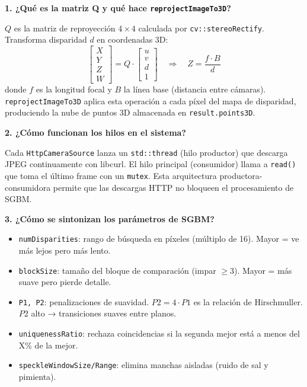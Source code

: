 \documentclass[11pt,a4paper]{article}
\begin{document}
\textbf{1. ¿Qué es la matriz Q y qué hace \texttt{reprojectImageTo3D}?}

$Q$ es la matriz de reproyección $4\times4$ calculada por \texttt{cv::stereoRectify}.
Transforma disparidad $d$ en coordenadas 3D:
\[
\begin{bmatrix} X \\ Y \\ Z \\ W \end{bmatrix} =
Q \cdot \begin{bmatrix} u \\ v \\ d \\ 1 \end{bmatrix}
\quad\Rightarrow\quad Z = \frac{f \cdot B}{d}
\]
donde $f$ es la longitud focal y $B$ la línea base (distancia entre cámaras).
\texttt{reprojectImageTo3D} aplica esta operación a cada píxel del mapa de disparidad,
produciendo la nube de puntos 3D almacenada en \texttt{result.points3D}.

\vspace{6pt}
\textbf{2. ¿Cómo funcionan los hilos en el sistema?}

Cada \texttt{HttpCameraSource} lanza un \texttt{std::thread} (hilo productor) que descarga
JPEG continuamente con libcurl. El hilo principal (consumidor) llama a \texttt{read()}
que toma el último frame con un \texttt{mutex}. Esta arquitectura productora-consumidora
permite que las descargas HTTP no bloqueen el procesamiento de SGBM.

\vspace{6pt}
\textbf{3. ¿Cómo se sintonizan los parámetros de SGBM?}

\begin{itemize}[leftmargin=*,noitemsep]
  \item \texttt{numDisparities}: rango de búsqueda en píxeles (múltiplo de 16). Mayor = ve más lejos pero más lento.
  \item \texttt{blockSize}: tamaño del bloque de comparación (impar $\geq 3$). Mayor = más suave pero pierde detalle.
  \item \texttt{P1, P2}: penalizaciones de suavidad. $P2 = 4 \cdot P1$ es la relación de Hirschmuller. $P2$ alto → transiciones suaves entre planos.
  \item \texttt{uniquenessRatio}: rechaza coincidencias si la segunda mejor está a menos del X\% de la mejor.
  \item \texttt{speckleWindowSize/Range}: elimina manchas aisladas (ruido de sal y pimienta).
\end{itemize}
\end{document}

